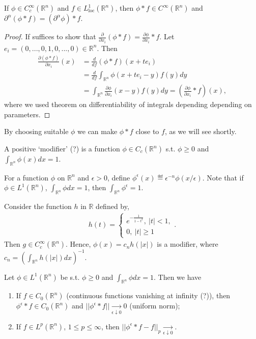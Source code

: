 \begin{lemma}
    If \(\phi\in C^{\infty}_{c}(\mathbb{R}^n)\) and \(f\in L^{1}_{\text{loc}}(\mathbb{R}^n)\), then \(\phi \ast f\in C^{\infty}(\mathbb{R}^n)\) and \(\partial^{\alpha}(\phi\ast f) = (\partial^{\alpha}\phi)\ast f\). 
\end{lemma}
\ifdetailed 
\begin{proof}
    If suffices to show that \(\frac{\partial}{\partial x_i}(\phi\ast f)= \frac{\partial\phi}{\partial x_i}\ast f\). Let \(e_i = (0,...,0,1,0,...,0)\in\mathbb{R}^n\). Then
    \begin{align*}
        \frac{\partial (\phi\ast f)}{\partial x_i}(x) &= \frac{d}{df} (\phi\ast f)(x + te_i) \\
        &= \frac{d}{df}\int_{\mathbb{R}^n}\phi(x+te_i-y)f(y)dy \\ 
        &= \int_{\mathbb{R}^n}\frac{\partial\phi}{\partial x_i}(x-y)f(y)dy = \left(\frac{\partial\phi}{\partial x_i}\ast f\right)(x),
    \end{align*}
    where we used theorem on differentiability of integrals depending depending on parameters. 
\end{proof}
\fi 
By choosing suitable \(\phi\) we can make \(\phi\ast f\) close to \(f\), as we will see shortly.
\begin{definition}
    A positive `modifier' (?) is a function \(\phi\in C_c(\mathbb{R}^n)\) s.t. \(\phi\geq 0\) and \(\int_{\mathbb{R}^n}\phi(x)dx=1\).
\end{definition}
For a function \(\phi\) on \(\mathbb{R}^n\) and \(\epsilon>0\), define \(\phi^{\epsilon}(x) \eqdef \epsilon^{-n}\phi(x/\epsilon)\). Note that if \(\phi\in L^1(\mathbb{R}^n)\), \(\int_{\mathbb{R}^n}\phi dx=1\), then \(\int_{\mathbb{R}^n}\phi^{\epsilon}=1\).
\begin{example}
    Consider the function \(h\) in \(\mathbb{R}\) defined by,
    \begin{align*}
        h(t) = \begin{cases}
            e^{-\frac{1}{1-t^2}}, \ |t| < 1, \\
            0, \ |t|\geq 1
        \end{cases}.
    \end{align*}
    Then \(g\in C^{\infty}_{c}(\mathbb{R}^n)\). Hence, \(\phi(x)= c_n h(|x|)\) is a modifier, where \(c_n = \left(\int_{\mathbb{R}^n}h(|x|)dx\right)^{-1}\).
\end{example}
\begin{proposition}
    Let \(\phi\in L^1(\mathbb{R}^n)\) be s.t. \(\phi\geq 0\) and \(\int_{\mathbb{R}^n}\phi dx=1\). Then we have
    \begin{enumerate}[label=(\roman*)]
        \item If \(f\in C_0(\mathbb{R}^n)\) (continuous functions vanishing at infinity (?)), then \(\phi^{\epsilon}\ast f\in C_0(\mathbb{R}^n)\) and \(||\phi^{\epsilon}\ast f||\xrightarrow[\epsilon\downarrow 0]{ } 0\) (uniform norm);
        \item If \(f\in L^p(\mathbb{R}^n)\), \(1\leq p\leq\infty\), then \(||\phi^{\epsilon}\ast f -f||_p\xrightarrow[\epsilon\downarrow 0]{ }\).
    \end{enumerate}
\end{proposition}
